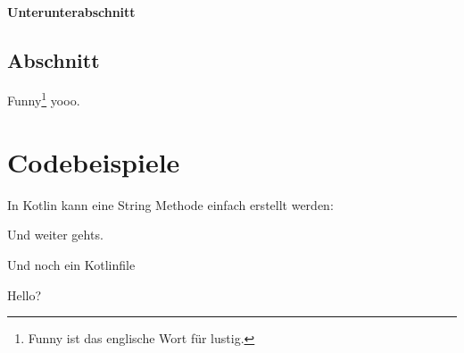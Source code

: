 \subsubsection{Unterunterabschnitt}\label{subsubsec:example3-2-2}
\section{Abschnitt}\label{sec:example4}
Funny\footnote{Funny ist das englische Wort für lustig.} yooo.

\chapter{Codebeispiele}\label{ch:example5}
In Kotlin kann eine String Methode einfach erstellt werden:

Und weiter gehts.

Und noch ein Kotlinfile


Hello?

